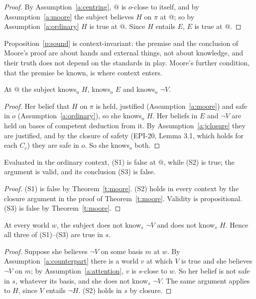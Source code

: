 \documentclass{situationist-preprint}
\begin{document}
\begin{proof}
By Assumption~\ref{a:centring}, $@$ is $o$-close to itself, and by Assumption~\ref{a:moore} the subject believes $H$ on $\pi$ at $@$; so by Assumption~\ref{a:ordinary} $H$ is true at $@$. Since $H$ entails $E$, $E$ is true at $@$.
\end{proof}

Proposition~\ref{p:sound} is context-invariant: the premise and the conclusion of Moore's proof are about hands and external things, not about knowledge, and their truth does not depend on the standards in play. Moore's further condition, that the premise be known, is where context enters.

\begin{theorem}\label{t:moore}
At $@$ the subject knows$_o$ $H$, knows$_o$ $E$ and knows$_o$ $\neg V$.
\end{theorem}

\begin{proof}
Her belief that $H$ on $\pi$ is held, justified (Assumption~\ref{a:moore}) and safe in $o$ (Assumption~\ref{a:ordinary}), so she knows$_o$ $H$. Her beliefs in $E$ and $\neg V$ are held on bases of competent deduction from it. By Assumption~\ref{a:jclosure} they are justified, and by the closure of safety (EPI-20, Lemma 3.1, which holds for each $C_c$) they are safe in $o$. So she knows$_o$ both.
\end{proof}

\begin{corollary}\label{c:false}
Evaluated in the ordinary context, (S1) is false at $@$, while (S2) is true; the argument is valid, and its conclusion (S3) is false.
\end{corollary}

\begin{proof}
(S1) is false by Theorem~\ref{t:moore}. (S2) holds in every context by the closure argument in the proof of Theorem~\ref{t:moore}. Validity is propositional. (S3) is false by Theorem~\ref{t:moore}.
\end{proof}

\begin{theorem}\label{t:sceptic}
At every world $w$, the subject does not know$_s$ $\neg V$ and does not know$_s$ $H$. Hence all three of (S1)--(S3) are true in $s$.
\end{theorem}

\begin{proof}
Suppose she believes $\neg V$ on some basis $m$ at $w$. By Assumption~\ref{a:counterpart} there is a world $v$ at which $V$ is true and she believes $\neg V$ on $m$; by Assumption~\ref{a:attention}, $v$ is $s$-close to $w$. So her belief is not safe in $s$, whatever its basis, and she does not know$_s$ $\neg V$. The same argument applies to $H$, since $V$ entails $\neg H$. (S2) holds in $s$ by closure.
\end{proof}
\end{document}
